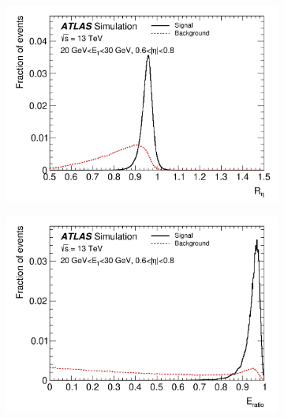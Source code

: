 \begin{figure}[h]
\begin{subfigure}[b]{0.495\textwidth}
    \includegraphics[width=1.0\textwidth]{figs/egamma/R_eta.png} 
    \label{fig:egamma:Reta}
  \end{subfigure}
  \hfill
  \begin{subfigure}[b]{0.495\textwidth}
    \centering
    \includegraphics[width=1.0\textwidth]{figs/egamma/E_ratio.png} 
    \label{fig:egamma:Eratio}
  \end{subfigure}
  \hfill
  

\end{figure}

